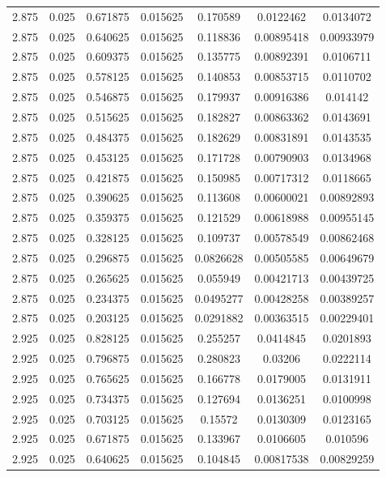 \begin{flushleft}
\begin{longtable}{ccccccc}
2.875 & 0.025 & 0.671875 & 0.015625 & 0.170589 & 0.0122462 & 0.0134072  \\ 
2.875 & 0.025 & 0.640625 & 0.015625 & 0.118836 & 0.00895418 & 0.00933979  \\ 
2.875 & 0.025 & 0.609375 & 0.015625 & 0.135775 & 0.00892391 & 0.0106711  \\ 
2.875 & 0.025 & 0.578125 & 0.015625 & 0.140853 & 0.00853715 & 0.0110702  \\ 
2.875 & 0.025 & 0.546875 & 0.015625 & 0.179937 & 0.00916386 & 0.014142  \\ 
2.875 & 0.025 & 0.515625 & 0.015625 & 0.182827 & 0.00863362 & 0.0143691  \\ 
2.875 & 0.025 & 0.484375 & 0.015625 & 0.182629 & 0.00831891 & 0.0143535  \\ 
2.875 & 0.025 & 0.453125 & 0.015625 & 0.171728 & 0.00790903 & 0.0134968  \\ 
2.875 & 0.025 & 0.421875 & 0.015625 & 0.150985 & 0.00717312 & 0.0118665  \\ 
2.875 & 0.025 & 0.390625 & 0.015625 & 0.113608 & 0.00600021 & 0.00892893  \\ 
2.875 & 0.025 & 0.359375 & 0.015625 & 0.121529 & 0.00618988 & 0.00955145  \\ 
2.875 & 0.025 & 0.328125 & 0.015625 & 0.109737 & 0.00578549 & 0.00862468  \\ 
2.875 & 0.025 & 0.296875 & 0.015625 & 0.0826628 & 0.00505585 & 0.00649679  \\ 
2.875 & 0.025 & 0.265625 & 0.015625 & 0.055949 & 0.00421713 & 0.00439725  \\ 
2.875 & 0.025 & 0.234375 & 0.015625 & 0.0495277 & 0.00428258 & 0.00389257  \\ 
2.875 & 0.025 & 0.203125 & 0.015625 & 0.0291882 & 0.00363515 & 0.00229401  \\ 
2.925 & 0.025 & 0.828125 & 0.015625 & 0.255257 & 0.0414845 & 0.0201893  \\ 
2.925 & 0.025 & 0.796875 & 0.015625 & 0.280823 & 0.03206 & 0.0222114  \\ 
2.925 & 0.025 & 0.765625 & 0.015625 & 0.166778 & 0.0179005 & 0.0131911  \\ 
2.925 & 0.025 & 0.734375 & 0.015625 & 0.127694 & 0.0136251 & 0.0100998  \\ 
2.925 & 0.025 & 0.703125 & 0.015625 & 0.15572 & 0.0130309 & 0.0123165  \\ 
2.925 & 0.025 & 0.671875 & 0.015625 & 0.133967 & 0.0106605 & 0.010596  \\ 
2.925 & 0.025 & 0.640625 & 0.015625 & 0.104845 & 0.00817538 & 0.00829259  \\ 

\end{longtable}
\end{flushleft}

